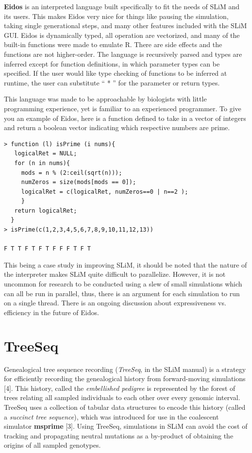 \documentclass{article}
\begin{document}
\textbf{Eidos} is an interpreted language built specifically to fit the needs of SLiM and its users.
This makes Eidos very nice for things like pausing the simulation, taking single generational steps,
and many other features included with the SLiM GUI. 
Eidos is dynamically typed,
all operation are vectorized, and many of the built-in functions were made to emulate R.
There are side effects and the functions are not higher-order.
The language is recursively parsed and types are inferred except for function definitions, in which parameter types can be specified.
If the user would like type checking of functions to be inferred at runtime, the user can substitute `` * '' for the parameter or return types.

This language was made to be approachable by biologists with little programming experience,
yet is familiar to an experienced programmer.
To give you an example of Eidos, here is a function defined to take in a vector of integers and 
return a boolean vector indicating which respective numbers are prime.

\begin{lstlisting}[basicstyle=\small,]
> function (l) isPrime (i nums){
   logicalRet = NULL;
   for (n in nums){
     mods = n % (2:ceil(sqrt(n)));
     numZeros = size(mods[mods == 0]);
     logicalRet = c(logicalRet, numZeros==0 | n==2 );
     }
   return logicalRet;
  }
> isPrime(c(1,2,3,4,5,6,7,8,9,10,11,12,13))

F T T F T F T F F F T F T

\end{lstlisting}

This being a case study in improving SLiM,
it should be noted that the nature of the interpreter makes SLiM quite difficult to parallelize.
However, it is not uncommon for research to be conducted using a slew of small simulations which can all be run in parallel,
thus, there is an argument for each simulation to run on a single thread.
There is an ongoing discussion about expressiveness vs. efficiency in the future of Eidos. 

\section{TreeSeq}

Genealogical tree sequence recording (\textit{TreeSeq}, in the SLiM manual) is a strategy for efficiently recording the 
genealogical history from forward-moving simulations [4]. 
This history, called the \textit{embellished pedigree}
is represented by the forest of trees relating all sampled individuals to each other over every genomic interval. 
TreeSeq uses a collection of tabular data structures to encode this history (called a \textit{succinct tree sequence}), 
which was introduced for use in the coalescent simulator \textbf{msprime} [3]. 
Using TreeSeq, simulations in SLiM can avoid the cost of tracking and propagating neutral mutations 
as a by-product of obtaining the origins of all sampled genotypes.
\end{document}
